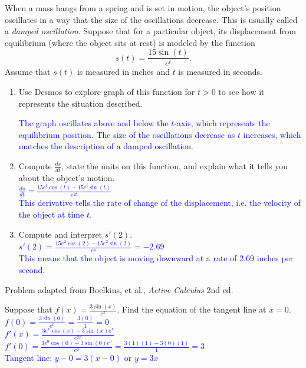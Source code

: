 \documentclass{ximera}
\begin{document}
\begin{exercise}
    When a mass hangs from a spring and is set in motion, the object's position oscillates in a way that the size of the oscillations decrease. This is usually called a \textit{damped oscillation}. Suppose that for a particular object, its displacement from equilibrium (where the object sits at rest) is modeled by the function \[s(t)=\frac{15\sin(t)}{e^t}.\]
    Assume that $s(t)$ is measured in inches and $t$ is measured in seconds. 
    \begin{enumerate} 
        \item Use Desmos to explore graph of this function for $t>0$ to see how it represents the situation described. \\
        \begin{center}
        \end{center}
        \textcolor{blue}{The graph oscillates above and below the $t$-axis, which represents the equilibrium position. The size of the oscillations decrease as $t$ increases, which matches the description of a damped oscillation.}

        \item Compute $\frac{ds}{dt}$, state the units on this function, and explain what it tells you about the object's motion. \\
        \textcolor{blue}{$\frac{ds}{dt}=\frac{15e^t\cos(t)-15e^t\sin(t)}{e^{2t}}$\\
        This derivative tells the rate of change of the displacement, i.e. the velocity of the object at time $t$.}

        \item Compute and interpret $s'(2)$.\\
        \textcolor{blue}{$s'(2)=\frac{15e^2\cos(2)-15e^2\sin(2)}{e^{4}}=-2.69$ \\
        This means that the object is moving downward at a rate of 2.69 inches per second.}
    \end{enumerate}
    Problem adapted from Boelkins, et al., \textit{Active Calculus} 2nd ed.
\end{exercise}

\begin{exercise}
    Suppose that $f(x)=\frac{3\sin(x)}{e^x}$.  Find the equation of the tangent line at $x=0.$\\
    \textcolor{blue}{ $f(0)=\frac{3\sin(0)}{e^0}=\frac{3(0)}{1}=0$\\
    $f'(x)=\frac{3e^x\cos(x)-3\sin(x)e^x}{e^{2x}}$\\
    $f'(0)=\frac{3e^0\cos(0)-3\sin(0)e^0}{e^0}=\frac{3(1)(1)-3(0)(1)}{1}=3$\\
    Tangent line: $y-0=3(x-0)$ or $y=3x$}
\end{exercise}
\end{document}
